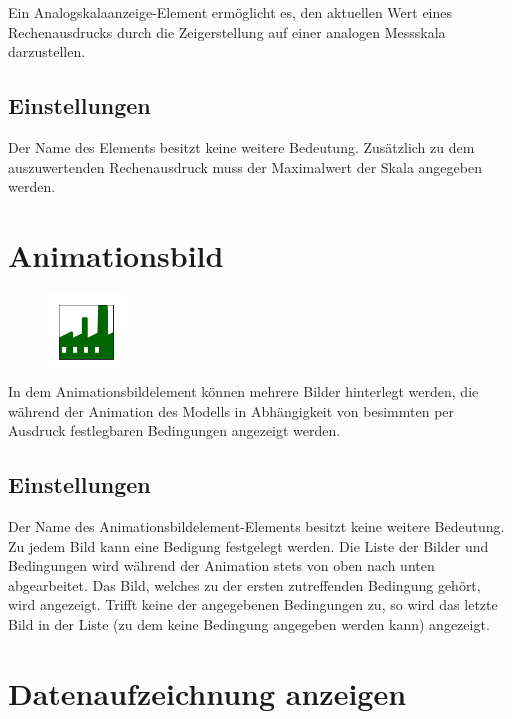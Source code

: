 Ein Analogskalaanzeige-Element ermöglicht es, den aktuellen Wert eines Rechenausdrucks
durch die Zeigerstellung auf einer analogen Messskala darzustellen.

\subsection*{Einstellungen}

Der Name des Elements besitzt keine weitere Bedeutung.
Zusätzlich zu dem auszuwertenden Rechenausdruck muss
der Maximalwert der Skala angegeben werden.


\section{Animationsbild}
\label{ref:ModelElementAnimationImage}

\begin{figure}
\vspace{-22pt}
\includegraphics[width=2cm]{imageModelElementAnimationImage.png}
\vspace{-22pt}
\end{figure}

In dem Animationsbildelement können mehrere Bilder hinterlegt werden, die während der
Animation des Modells in Abhängigkeit von besimmten per Ausdruck festlegbaren
Bedingungen angezeigt werden.

\subsection*{Einstellungen}

Der Name des Animationsbildelement-Elements besitzt keine weitere Bedeutung. 
Zu jedem Bild kann eine Bedigung festgelegt werden. Die Liste der Bilder und
Bedingungen wird während der Animation stets von oben nach unten abgearbeitet.
Das Bild, welches zu der ersten zutreffenden Bedingung gehört, wird angezeigt.
Trifft keine der angegebenen Bedingungen zu, so wird das letzte Bild in der
Liste (zu dem keine Bedingung angegeben werden kann) angezeigt.


\section{Datenaufzeichnung anzeigen}
\label{ref:ModelElementAnimationRecord}

